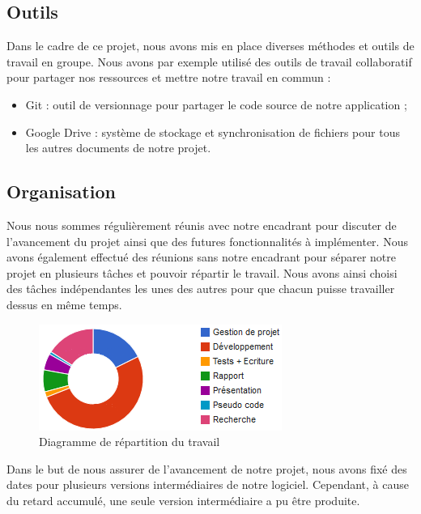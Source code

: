 \subsection{Outils}

Dans le cadre de ce projet, nous avons mis en place diverses méthodes et outils de travail en groupe. Nous avons par exemple utilisé des outils de travail collaboratif pour partager nos ressources et mettre notre travail en commun :
\begin{itemize}
  \item Git : outil de versionnage pour partager le code source de notre application ;
  \item Google Drive : système de stockage et synchronisation de fichiers pour tous les autres documents de notre projet.
\end{itemize}

\subsection{Organisation}

Nous nous sommes régulièrement réunis avec notre encadrant pour discuter de l'avancement du projet ainsi que des futures fonctionnalités à implémenter. Nous avons également effectué des réunions sans notre encadrant pour séparer notre projet en plusieurs tâches et pouvoir répartir le travail. Nous avons ainsi choisi des tâches indépendantes les unes des autres pour que chacun puisse travailler dessus en même temps.

\begin{figure}[!h]
  \begin{center}
  \includegraphics[scale=1]{res/05-1-work_repartition_chart_2.png}
  \caption{Diagramme de répartition du travail}
  \label{05-1-work_repartition_chart}
  \end{center}
\end{figure}

Dans le but de nous assurer de l'avancement de notre projet, nous avons fixé des dates pour plusieurs versions intermédiaires de notre logiciel. Cependant, à cause du retard accumulé, une seule version intermédiaire a pu être produite.

